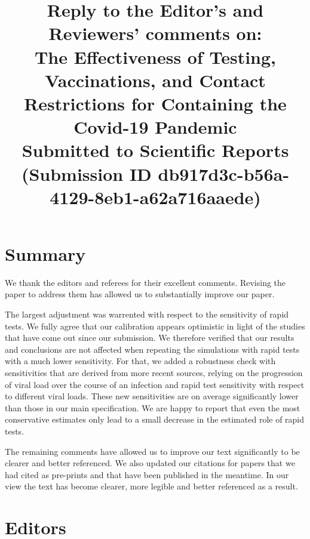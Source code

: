 \documentclass[a4paper,11pt]{article}
\theoremstyle{plain}
\begin{document}
\title{\large Reply to the Editor's and Reviewers' comments on: \\[2ex]
    \LARGE The Effectiveness of Testing, Vaccinations, and Contact Restrictions for
    Containing the Covid-19 Pandemic\\[2ex]
    \large Submitted to Scientific Reports \\(Submission ID
    db917d3c-b56a-4129-8eb1-a62a716aaede)\\[-6ex]
}

\author{}
\date{}

\maketitle

\section*{Summary}

We thank the editors and referees for their excellent comments. Revising the
paper to address them has allowed us to substantially improve our paper. 

The largest adjustment was warrented with respect to the sensitivity of rapid
tests. We fully agree that our calibration appears optimistic in light of the
studies that have come out since our submission. We therefore verified that 
our results and conclusions are not affected when repeating the simulations 
with rapid tests with a much lower sensitivity. For that, we added a robustness
check with sensitivities that are derived from more recent
sources, relying on the progression of viral load over the course of an
infection and rapid test sensitivity with respect to different viral loads. 
These new sensitivities are on average significantly lower than those in our 
main specification. We are happy to report that even the most conservative 
estimates only lead to a small decrease in the estimated role of rapid tests. 

The remaining comments have allowed us to improve our text significantly to be
clearer and better referenced. We also updated our citations for papers that we
had cited as pre-prints and that have been published in the meantime.
In our view the text has become clearer, more legible and better referenced 
as a result.


\section*{Editors}
\end{document}
